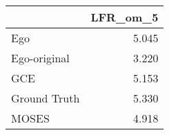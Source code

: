 \begin{tabular}{lr}
\toprule
{} & LFR_om_5 \\
\midrule
Ego          &    5.045 \\
Ego-original &    3.220 \\
GCE          &    5.153 \\
Ground Truth &    5.330 \\
MOSES        &    4.918 \\
\bottomrule
\end{tabular}

